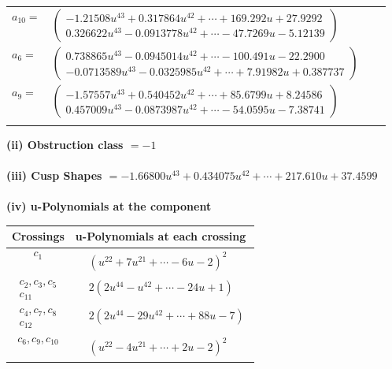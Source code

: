 \documentclass[1p]{elsarticle_modified}
\theoremstyle{definition}
\begin{document}
\begin{tabular}{m{7pt} m{180pt} m{7pt} m{180pt} }
\flushright $a_{10}=$&$\begin{pmatrix}-1.21508 u^{43}+0.317864 u^{42}+\cdots+169.292 u+27.9292\\0.326622 u^{43}-0.0913778 u^{42}+\cdots-47.7269 u-5.12139\end{pmatrix}$ \\
\flushright $a_{6}=$&$\begin{pmatrix}0.738865 u^{43}-0.0945014 u^{42}+\cdots-100.491 u-22.2900\\-0.0713589 u^{43}-0.0325985 u^{42}+\cdots+7.91982 u+0.387737\end{pmatrix}$ \\
\flushright $a_{9}=$&$\begin{pmatrix}-1.57557 u^{43}+0.540452 u^{42}+\cdots+85.6799 u+8.24586\\0.457009 u^{43}-0.0873987 u^{42}+\cdots-54.0595 u-7.38741\end{pmatrix}$\\&\end{tabular}
\flushleft \textbf{(ii) Obstruction class $= -1$}\\~\\
\flushleft \textbf{(iii) Cusp Shapes $= -1.66800 u^{43}+0.434075 u^{42}+\cdots+217.610 u+37.4599$}\\~\\
\newpage\renewcommand{\arraystretch}{1}
\flushleft \textbf{(iv) u-Polynomials at the component}\newline \\
\begin{tabular}{m{50pt}|m{274pt}}
Crossings & \hspace{64pt}u-Polynomials at each crossing \\
\hline $$\begin{aligned}c_{1}\end{aligned}$$&$\begin{aligned}
&(u^{22}+7 u^{21}+\cdots-6 u-2)^{2}
\end{aligned}$\\
\hline $$\begin{aligned}c_{2},c_{3},c_{5}\\c_{11}\end{aligned}$$&$\begin{aligned}
&2(2 u^{44}- u^{42}+\cdots-24 u+1)
\end{aligned}$\\
\hline $$\begin{aligned}c_{4},c_{7},c_{8}\\c_{12}\end{aligned}$$&$\begin{aligned}
&2(2 u^{44}-29 u^{42}+\cdots+88 u-7)
\end{aligned}$\\
\hline $$\begin{aligned}c_{6},c_{9},c_{10}\end{aligned}$$&$\begin{aligned}
&(u^{22}-4 u^{21}+\cdots+2 u-2)^{2}
\end{aligned}$\\
\hline
\end{tabular}\\~\\
\end{document}
